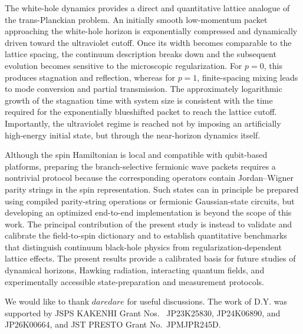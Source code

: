 \documentclass[reprint,amsmath,amssymb,aps,showkeys,superscriptaddress]{revtex4-2}
\begin{document}
The white-hole dynamics provides a direct and quantitative lattice
analogue of the trans-Planckian problem. An initially smooth
low-momentum packet approaching the white-hole horizon is
exponentially compressed and dynamically driven toward the
ultraviolet cutoff. Once its width becomes comparable to the lattice
spacing, the continuum description breaks down and the subsequent
evolution becomes sensitive to the microscopic regularization. For
$p=0$, this produces stagnation and reflection, whereas for $p=1$,
finite-spacing mixing leads to mode conversion and partial
transmission. The approximately logarithmic growth of the
stagnation time with system size is consistent with the time
required for the exponentially blueshifted packet to reach the
lattice cutoff. Importantly, the ultraviolet regime is reached not
by imposing an artificially high-energy initial state, but through
the near-horizon dynamics itself.

Although the spin Hamiltonian is local and compatible with
qubit-based platforms, preparing the branch-selective fermionic wave
packets requires a nontrivial protocol because the corresponding
operators contain Jordan--Wigner parity strings in the spin
representation. Such states can in principle be prepared using
compiled parity-string operations or fermionic Gaussian-state
circuits, but developing an optimized end-to-end implementation is
beyond the scope of this work. The principal contribution of the
present study is instead to validate and calibrate the
field-to-spin dictionary and to establish quantitative benchmarks
that distinguish continuum black-hole physics from
regularization-dependent lattice effects. The present results
provide a calibrated basis for future studies of dynamical horizons,
Hawking radiation, interacting quantum fields, and experimentally
accessible state-preparation and measurement protocols.

\begin{acknowledgments}
We would like to thank $daredare$ for useful discussions. The work of D.Y. was supported by JSPS KAKENHI Grant Nos.~ JP23K25830, JP24K06890, and JP26K00664, and JST PRESTO Grant No.~JPMJPR245D.
\end{acknowledgments}


\end{document}
